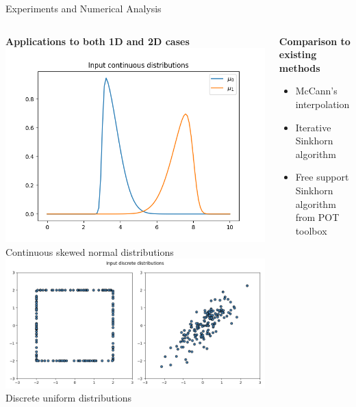 \begin{frame}{Experiments and Numerical Analysis}
    \begin{columns}
        \begin{column}{.6\textwidth}
            \centering
            \textbf{Applications to both 1D and 2D cases} \\
            \includegraphics[height=.35\textheight]{figures/1D_inputs.png} \\
            Continuous skewed normal distributions
            \includegraphics[height=.35\textheight]{figures/2D_inputs.png} \\
            Discrete uniform distributions
        \end{column}
        \begin{column}{.4\textwidth}
        \textbf{Comparison to existing methods} 
        \begin{itemize}
            \item McCann's interpolation
            \item Iterative Sinkhorn algorithm
            \item Free support Sinkhorn algorithm \parencite{cuturi_fast_2014} from POT toolbox \parencite{flamary_pot_2021}
        \end{itemize}
        \end{column}
    \end{columns}
\end{frame}

